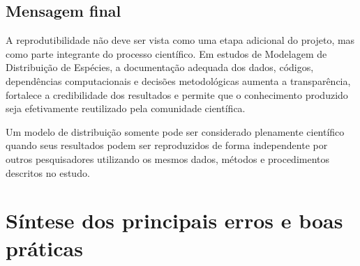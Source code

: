 \documentclass{ueap-sdm}
\begin{document}
\subsection{Mensagem final}

A reprodutibilidade não deve ser vista como uma etapa adicional do projeto,
mas como parte integrante do processo científico. Em estudos de Modelagem de
Distribuição de Espécies, a documentação adequada dos dados, códigos,
dependências computacionais e decisões metodológicas aumenta a transparência,
fortalece a credibilidade dos resultados e permite que o conhecimento produzido
seja efetivamente reutilizado pela comunidade científica.

\begin{sdmkeybox}
	Um modelo de distribuição somente pode ser considerado plenamente
	científico quando seus resultados podem ser reproduzidos de forma
	independente por outros pesquisadores utilizando os mesmos dados,
	métodos e procedimentos descritos no estudo.
\end{sdmkeybox}

\section{Síntese dos principais erros e boas práticas}
\end{document}
